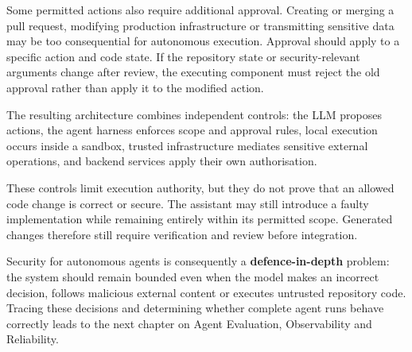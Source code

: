 Some permitted actions also require additional approval. Creating or merging a pull request, modifying production infrastructure or transmitting sensitive data may be too consequential for autonomous execution. Approval should apply to a specific action and code state. If the repository state or security-relevant arguments change after review, the executing component must reject the old approval rather than apply it to the modified action.

The resulting architecture combines independent controls: the LLM proposes actions, the agent harness enforces scope and approval rules, local execution occurs inside a sandbox, trusted infrastructure mediates sensitive external operations, and backend services apply their own authorisation.

These controls limit execution authority, but they do not prove that an allowed code change is correct or secure. The assistant may still introduce a faulty implementation while remaining entirely within its permitted scope. Generated changes therefore still require verification and review before integration.

Security for autonomous agents is consequently a \textbf{defence-in-depth} problem: the system should remain bounded even when the model makes an incorrect decision, follows malicious external content or executes untrusted repository code. Tracing these decisions and determining whether complete agent runs behave correctly leads to the next chapter on Agent Evaluation, Observability and Reliability.
